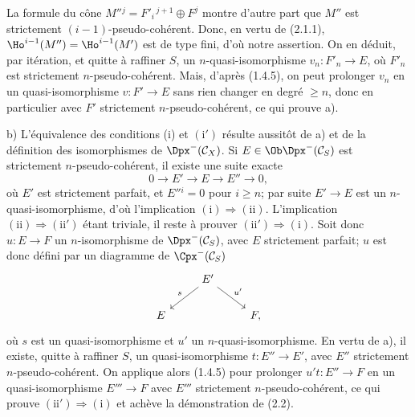 La
formule du cône \(M''{}^j=F'_i{}^{\,j+1}\oplus F^j\) montre d'autre part que \(M''\) est strictement \((i-1)\)-pseudo-cohérent. Donc, en vertu de (2.1.1), \(\Ho^{i-1}(M'')=\Ho^{i-1}(M')\) est de type fini, d'où notre assertion. On en déduit, par itération, et quitte à raffiner \(S\), un \(n\)-quasi-isomorphisme \(v_n:F'_n\longrightarrow E\), où \(F'_n\) est strictement \(n\)-pseudo-cohérent. Mais, d'après (1.4.5), on peut prolonger \(v_n\) en un quasi-isomorphisme \(v:F'\longrightarrow E\) sans rien changer en degré \(\geq n\), donc en particulier avec \(F'\) strictement \(n\)-pseudo-cohérent, ce qui prouve a).

b) L'équivalence des conditions (i) et \((\mathrm{i}')\) résulte aussitôt de a) et de la définition des isomorphismes de \(\Dpx^-(\mathcal C_X)\). Si \(E\in\Ob\Dpx^-(\mathcal C_S)\) est strictement \(n\)-pseudo-cohérent, il existe une suite exacte
\[
  0\longrightarrow E'\longrightarrow E\longrightarrow E''\longrightarrow 0,
\]
où \(E'\) est strictement parfait, et \(E''{}^i=0\) pour \(i\geq n\); par suite \(E'\to E\) est un \(n\)-quasi-isomorphisme, d'où l'implication \((\mathrm{i})\Rightarrow(\mathrm{ii})\). L'implication \((\mathrm{ii})\Rightarrow(\mathrm{ii}')\) étant triviale, il reste à prouver \((\mathrm{ii}')\Rightarrow(\mathrm{i})\). Soit donc \(u:E\longrightarrow F\) un \(n\)-isomorphisme de \(\Dpx^-(\mathcal C_S)\), avec \(E\) strictement parfait; \(u\) est donc défini par un diagramme de \(\Cpx^-(\mathcal C_S)\)
\[
\begin{tikzcd}
& E' \arrow[dl,"s"'] \arrow[dr,"u'"]\\
E && F ,
\end{tikzcd}
\]
où \(s\) est un quasi-isomorphisme et \(u'\) un \(n\)-quasi-isomorphisme. En vertu de a), il existe, quitte à raffiner \(S\), un quasi-isomorphisme \(t:E''\longrightarrow E'\), avec \(E''\) strictement \(n\)-pseudo-cohérent. On applique alors (1.4.5) pour prolonger \(u't:E''\to F\) en un quasi-isomorphisme \(E'''\longrightarrow F\) avec \(E'''\) strictement \(n\)-pseudo-cohérent, ce qui prouve \((\mathrm{ii}')\Rightarrow(\mathrm{i})\) et achève la démonstration de (2.2).

